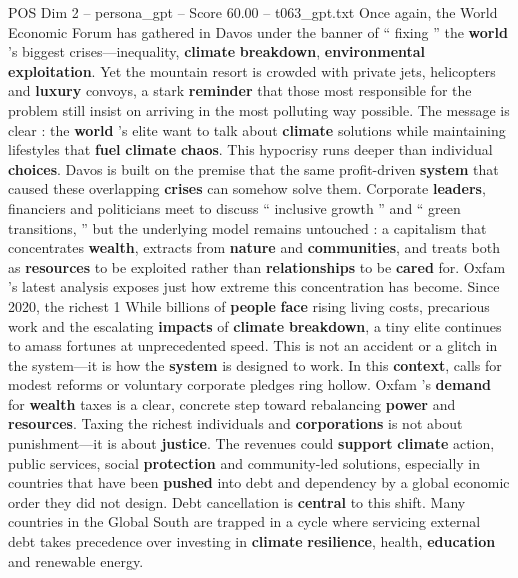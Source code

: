 \begin{textsample}{POS Dim 2 – persona\_gpt – Score 60.00 – t063\_gpt.txt}  \label{ex:f2_pos_011}
Once again, the World Economic Forum has gathered in Davos under the banner of “ fixing ” the \textbf{world} ’s biggest crises—inequality, \textbf{climate} \textbf{breakdown}, \textbf{environmental} \textbf{exploitation}.
Yet the mountain resort is crowded with private jets, helicopters and \textbf{luxury} convoys, a stark \textbf{reminder} that those most responsible for the problem still insist on arriving in the most polluting way possible.
The message is clear : the \textbf{world} ’s elite want to talk about \textbf{climate} solutions while maintaining lifestyles that \textbf{fuel} \textbf{climate} \textbf{chaos}.
This hypocrisy runs deeper than individual \textbf{choices}.
Davos is built on the premise that the same profit-driven \textbf{system} that caused these overlapping \textbf{crises} can somehow solve them.
Corporate \textbf{leaders}, financiers and politicians meet to discuss “ inclusive growth ” and “ green transitions, ” but the underlying model remains untouched : a capitalism that concentrates \textbf{wealth}, extracts from \textbf{nature} and \textbf{communities}, and treats both as \textbf{resources} to be exploited rather than \textbf{relationships} to be \textbf{cared} for.
Oxfam ’s latest analysis exposes just how extreme this concentration has become.
Since 2020, the richest 1 %
While billions of \textbf{people} \textbf{face} rising living costs, precarious work and the escalating \textbf{impacts} of \textbf{climate} \textbf{breakdown}, a tiny elite continues to amass fortunes at unprecedented speed.
This is not an accident or a glitch in the system—it is how the \textbf{system} is designed to work.
In this \textbf{context}, calls for modest reforms or voluntary corporate pledges ring hollow.
Oxfam ’s \textbf{demand} for \textbf{wealth} taxes is a clear, concrete step toward rebalancing \textbf{power} and \textbf{resources}.
Taxing the richest individuals and \textbf{corporations} is not about punishment—it is about \textbf{justice}.
The revenues could \textbf{support} \textbf{climate} action, public services, social \textbf{protection} and community-led solutions, especially in countries that have been \textbf{pushed} into debt and dependency by a global economic order they did not design.
Debt cancellation is \textbf{central} to this shift.
Many countries in the Global South are trapped in a cycle where servicing external debt takes precedence over investing in \textbf{climate} \textbf{resilience}, health, \textbf{education} and renewable energy.

\end{textsample}

